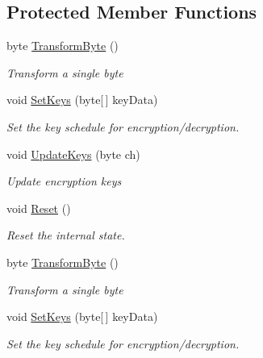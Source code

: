 \subsection*{Protected Member Functions}
\begin{DoxyCompactItemize}
\item 
byte \hyperlink{class_i_c_sharp_code_1_1_sharp_zip_lib_1_1_encryption_1_1_pkzip_classic_crypto_base_a074b6c6644e1b82d9dde60d8bcd1aa21}{Transform\+Byte} ()
\begin{DoxyCompactList}\small\item\em Transform a single byte \end{DoxyCompactList}\item 
void \hyperlink{class_i_c_sharp_code_1_1_sharp_zip_lib_1_1_encryption_1_1_pkzip_classic_crypto_base_af129fc823a90800575c19fadf5600b0e}{Set\+Keys} (byte\mbox{[}$\,$\mbox{]} key\+Data)
\begin{DoxyCompactList}\small\item\em Set the key schedule for encryption/decryption. \end{DoxyCompactList}\item 
void \hyperlink{class_i_c_sharp_code_1_1_sharp_zip_lib_1_1_encryption_1_1_pkzip_classic_crypto_base_a7ee277def4a9c274b50619991fd4aa34}{Update\+Keys} (byte ch)
\begin{DoxyCompactList}\small\item\em Update encryption keys \end{DoxyCompactList}\item 
void \hyperlink{class_i_c_sharp_code_1_1_sharp_zip_lib_1_1_encryption_1_1_pkzip_classic_crypto_base_aaf029090e29dd232d503dbe33bda2a75}{Reset} ()
\begin{DoxyCompactList}\small\item\em Reset the internal state. \end{DoxyCompactList}\item 
byte \hyperlink{class_i_c_sharp_code_1_1_sharp_zip_lib_1_1_encryption_1_1_pkzip_classic_crypto_base_a074b6c6644e1b82d9dde60d8bcd1aa21}{Transform\+Byte} ()
\begin{DoxyCompactList}\small\item\em Transform a single byte \end{DoxyCompactList}\item 
void \hyperlink{class_i_c_sharp_code_1_1_sharp_zip_lib_1_1_encryption_1_1_pkzip_classic_crypto_base_af129fc823a90800575c19fadf5600b0e}{Set\+Keys} (byte\mbox{[}$\,$\mbox{]} key\+Data)
\begin{DoxyCompactList}\small\item\em Set the key schedule for encryption/decryption. \end{DoxyCompactList}\item 

\end{DoxyCompactItemize}
